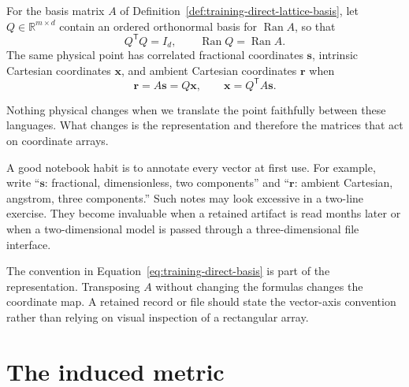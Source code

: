 \begin{definition}
\label{def:training-intrinsic-frame}
For the basis matrix $A$ of Definition~\ref{def:training-direct-lattice-basis},
let $Q\in\mathbb R^{m\times d}$ contain an ordered orthonormal basis for
$\operatorname{Ran}A$, so that
\begin{equation}
  Q^{\mathsf T}Q=I_d,
  \qquad
  \operatorname{Ran}Q=\operatorname{Ran}A.
  \label{eq:training-intrinsic-frame}
\end{equation}
The same physical point has correlated fractional coordinates $\mathbf s$,
intrinsic Cartesian coordinates $\mathbf x$, and ambient Cartesian coordinates
$\mathbf r$ when
\begin{equation}
  \mathbf r=A\mathbf s=Q\mathbf x,
  \qquad
  \mathbf x=Q^{\mathsf T}A\mathbf s.
  \label{eq:training-three-coordinate-languages}
\end{equation}
\end{definition}
Nothing physical changes when we translate the point faithfully between these
languages. What changes is the representation and therefore the matrices that
act on coordinate arrays.

A good notebook habit is to annotate every vector at first use. For example,
write ``$\mathbf s$: fractional, dimensionless, two components'' and
``$\mathbf r$: ambient Cartesian, angstrom, three components.'' Such notes may
look excessive in a two-line exercise. They become invaluable when a retained
artifact is read months later or when a two-dimensional model is passed through
a three-dimensional file interface.

\begin{remark}
The convention in Equation~\eqref{eq:training-direct-basis} is part of the
representation. Transposing $A$ without changing the formulas changes the
coordinate map. A retained record or file should state the vector-axis
convention rather than relying on visual inspection of a rectangular array.
\end{remark}

\section{The induced metric}

